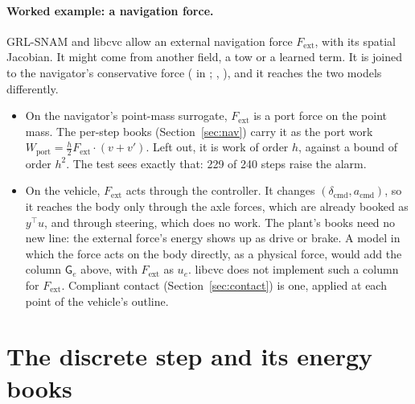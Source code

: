 \documentclass[11pt]{article}
\theoremstyle{remark}
\newcommand{\G}{\mathsf G}
\newcommand{\T}{^{\top}}
\begin{document}
\paragraph{Worked example: a navigation force.} GRL-SNAM and libcvc allow an external navigation
force $F_{\mathrm{ext}}$, with its spatial Jacobian. It might come from another field, a tow
or a learned term. It is joined to the navigator's conservative force ( in
; , ), and it reaches the
two models differently.
\begin{itemize}
  \item On the navigator's point-mass surrogate, $F_{\mathrm{ext}}$ is a port force on the point
        mass. The per-step books (Section~\ref{sec:nav}) carry it as the port work
        $W_{\mathrm{port}}=\tfrac h2F_{\mathrm{ext}}\cdot(v+v')$. Left out, it is work of
        order $h$, against a bound of order $h^2$. The test
         sees exactly that: 229 of 240 steps
        raise the alarm.
  \item On the vehicle, $F_{\mathrm{ext}}$ acts through the controller. It changes
        $(\delta_{\mathrm{cmd}},a_{\mathrm{cmd}})$, so it reaches the body only through the axle
        forces, which are already booked as $y\T u$, and through steering, which does no work. The
        plant's books need no new line: the external force's energy shows up as drive or brake.
        A model in which the force acts on the body directly, as a physical force, would add the
        column $\G_e$ above, with $F_{\mathrm{ext}}$ as $u_e$. libcvc does not implement such a
        column for $F_{\mathrm{ext}}$. Compliant contact (Section~\ref{sec:contact}) is one, applied
        at each point of the vehicle's outline.
\end{itemize}

\section{The discrete step and its energy books}
\label{sec:books}
\end{document}
